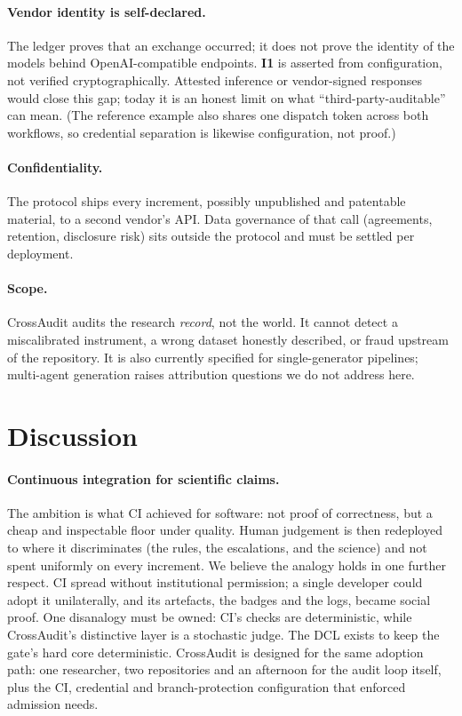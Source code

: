 \documentclass[11pt]{article}
\newcommand{\invariant}[1]{\textbf{I#1}}
\begin{document}
\paragraph{Vendor identity is self-declared.} The ledger proves that an exchange occurred; it does not prove the identity of the models behind OpenAI-compatible endpoints. \invariant{1} is asserted from configuration, not verified cryptographically. Attested inference or vendor-signed responses would close this gap; today it is an honest limit on what ``third-party-auditable'' can mean. (The reference example also shares one dispatch token across both workflows, so credential separation is likewise configuration, not proof.)

\paragraph{Confidentiality.} The protocol ships every increment, possibly unpublished and patentable material, to a second vendor's API. Data governance of that call (agreements, retention, disclosure risk) sits outside the protocol and must be settled per deployment.

\paragraph{Scope.} CrossAudit audits the research \emph{record}, not the world. It cannot detect a miscalibrated instrument, a wrong dataset honestly described, or fraud upstream of the repository. It is also currently specified for single-generator pipelines; multi-agent generation raises attribution questions we do not address here.

\section{Discussion}\label{sec:discussion}

\paragraph{Continuous integration for scientific claims.} The ambition is what CI achieved for software: not proof of correctness, but a cheap and inspectable floor under quality. Human judgement is then redeployed to where it discriminates (the rules, the escalations, and the science) and not spent uniformly on every increment. We believe the analogy holds in one further respect. CI spread without institutional permission; a single developer could adopt it unilaterally, and its artefacts, the badges and the logs, became social proof. One disanalogy must be owned: CI's checks are deterministic, while CrossAudit's distinctive layer is a stochastic judge. The DCL exists to keep the gate's hard core deterministic. CrossAudit is designed for the same adoption path: one researcher, two repositories and an afternoon for the audit loop itself, plus the CI, credential and branch-protection configuration that enforced admission needs.
\end{document}
